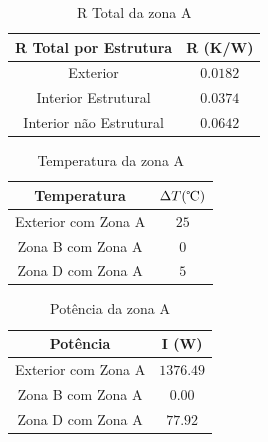 \documentclass[12pt, a4paper]{article}
\begin{document}
\vspace{15mm}

\begin{table}[htpb]
	\begin{center}
		\begin{tabular}{c c}
			\toprule
			R Total por Estrutura									 & 	R (K/W)  \\
			\midrule
			 Exterior			               				     & $0.0182$		 \\
			 Interior Estrutural             	   			 & $0.0374$		 \\
			 Interior n\~ao Estrutural          		 & $0.0642$		 \\
			\bottomrule
		\end{tabular}
	\end{center}
	\caption{R Total da zona A}\label{tab:seccaoAtotal}
\end{table}

\vspace{15mm}

\begin{table}[htpb]
	\begin{center}
		\begin{tabular}{c c}
			\toprule
			Temperatura    										 & 	$\Delta T (\celsius)$   \\
			\midrule
			 Exterior	com Zona A		               	     & $25$	 \\
			 Zona B com Zona A             	   			 & $0$		 \\
			 Zona D com Zona A          					 & $5$		 \\
			\bottomrule
		\end{tabular}
	\end{center}
	\caption{Temperatura da zona A}\label{tab:seccaoAtemp}
\end{table}

\pagebreak

\begin{table}[htpb]
	\begin{center}
		\begin{tabular}{c c}
			\toprule
			Potência   										 & 	I (W) \\
			\midrule
			 Exterior	com Zona A		               	     & $1376.49$	 \\
			 Zona B com Zona A             	   			 & $0.00$		 \\
			 Zona D com Zona A          					 & $77.92$		 \\
			\bottomrule
		\end{tabular}
	\end{center}
	\caption{Potência da zona A}\label{tab:seccaoApot}
\end{table}
\end{document}
